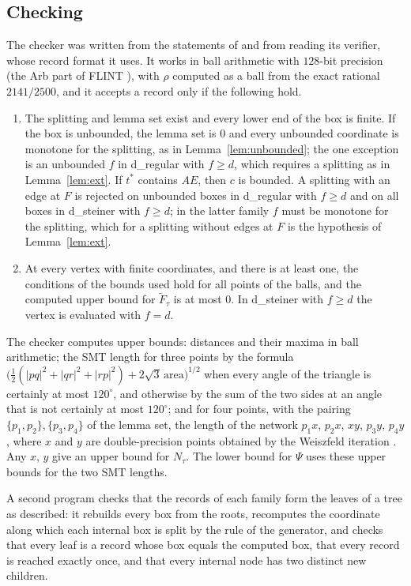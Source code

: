 \documentclass[11pt]{amsart}
\theoremstyle{definition}
\theoremstyle{remark}
\numberwithin{equation}{section}
\begin{document}
\subsection{Checking}\label{sec:check}
The checker was written from the statements of \cite{KHSHGW} and from reading its verifier, whose record format it uses. It works in ball arithmetic with $128$-bit precision (the Arb part of FLINT \cite{FLINT,Joh17}), with $\rho$ computed as a ball from the exact rational $2141/2500$, and it accepts a record only if the following hold.
\begin{enumerate}[leftmargin=*]
\item The splitting and lemma set exist and every lower end of the box is finite. If the box is unbounded, the lemma set is $0$ and every unbounded coordinate is monotone for the splitting, as in Lemma~\ref{lem:unbounded}; the one exception is an unbounded $f$ in d\_regular with $f\ge d$, which requires a splitting as in Lemma~\ref{lem:ext}. If $t^*$ contains $AE$, then $c$ is bounded. A splitting with an edge at $F$ is rejected on unbounded boxes in d\_regular with $f\ge d$ and on all boxes in d\_steiner with $f\ge d$; in the latter family $f$ must be monotone for the splitting, which for a splitting without edges at $F$ is the hypothesis of Lemma~\ref{lem:ext}.
\item At every vertex with finite coordinates, and there is at least one, the conditions of the bounds used hold for all points of the balls, and the computed upper bound for $\tilde F_\tau$ is at most $0$. In d\_steiner with $f\ge d$ the vertex is evaluated with $f=d$.
\end{enumerate}
The checker computes upper bounds: distances and their maxima in ball arithmetic; the SMT length for three points by the formula $\bigl(\frac12(|pq|^2+|qr|^2+|rp|^2)+2\sqrt3\,\mathrm{area}\bigr)^{1/2}$ when every angle of the triangle is certainly at most $120^\circ$, and otherwise by the sum of the two sides at an angle that is not certainly at most $120^\circ$; and for four points, with the pairing $\{p_1,p_2\},\{p_3,p_4\}$ of the lemma set, the length of the network $p_1x$, $p_2x$, $xy$, $p_3y$, $p_4y$, where $x$ and $y$ are double-precision points obtained by the Weiszfeld iteration \cite{Wei37}. Any $x$, $y$ give an upper bound for $N_\tau$. The lower bound for $\Psi$ uses these upper bounds for the two SMT lengths.

A second program checks that the records of each family form the leaves of a tree as described: it rebuilds every box from the roots, recomputes the coordinate along which each internal box is split by the rule of the generator, and checks that every leaf is a record whose box equals the computed box, that every record is reached exactly once, and that every internal node has two distinct new children.
\end{document}
